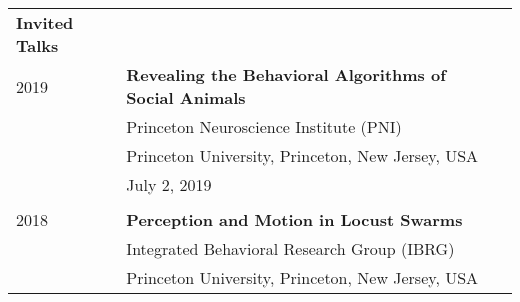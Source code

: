 \documentclass[letterpaper,6pt,oneside]{article}
\begin{document}
\begin{small}
\begin{longtable}{@{} l p{5.3in}l}
 \Large{\textbf{Invited Talks}}  \vspace{5mm} \\
 \large{2019}
 & \textbf{Revealing the Behavioral Algorithms of Social Animals} \\
 & Princeton Neuroscience Institute (PNI) \\
 & Princeton University, Princeton, New Jersey, USA \\
 & July 2, 2019 \\
 & \\
\large{2018}
& \textbf{Perception and Motion in Locust Swarms} \\
& Integrated Behavioral Research Group (IBRG) \\
& Princeton University, Princeton, New Jersey, USA \\

\end{longtable}
\end{small}
\end{document}
